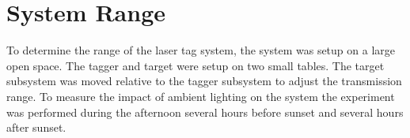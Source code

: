 




\section{System Range}

To determine the range of the laser tag system, the system was setup on a large open space. The tagger and target were setup on two small tables. The target subsystem was moved relative to the tagger subsystem to adjust the transmission range. To measure the impact of ambient lighting  on the system the experiment was performed during the afternoon several hours before sunset and several hours after sunset.


